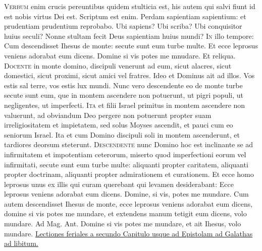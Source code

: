 \begin{multicols*}{2}
\lettrine[lines=2]{\zallmancaps \color{Red} V}{erbum} enim crucis pereuntibus quidem stulticia est, his autem qui salvi fiunt id est nobis virtus Dei est. Scriptum est enim. Perdam sapientiam sapientium: et prudentiam prudentium reprobabo. Ubi sapiens? Ubi scriba? Ubi conquisitor huius seculi? Nonne stultam fecit Deus sapientiam huius mundi?
\lettrine[lines=2]{\zallmancaps \color{Blue} I}{n} illo tempore: Cum descendisset Ihesus de monte: secute sunt eum turbe multe. Et ecce leprosus veniens adorabat eum dicens. Domine si vis potes me mnudare. Et reliqua.
\lettrine[lines=2]{\zallmancaps \color{Red} D}{ocente} in monte domino, discipuli venerunt ad eum, sicut alacres, sicut domestici, sicut proximi, sicut amici vel fratres. Ideo et Dominus ait ad illos. Vos estis sal terre, vos estis lux mundi. Nunc vero descendente eo de monte turbe secute sunt eum, que in montem ascendere non potuerunt, ut pigri populi, ut negligentes, ut imperfecti.
\lettrine[lines=2]{\zallmancaps \color{Red} I}{ta} et filii Israel primitus in montem ascendere non valuerunt, ad obviandum Deo pergere non potuerunt propter suam irreligiositatem et impietatem, sed solus Moyses ascendit, et pauci cum eo seniorum Israel. Ita et cum Domino discipuli soli in montem ascenderunt, et tardiores deorsum steterunt.
\lettrine[lines=2]{\zallmancaps \color{Blue} D}{escendente} nunc Domino hoc est inclinante se ad infirmitatem et impotentiam ceterorum, miserto quod imperfectioni eorum vel infirmitati, secute sunt eum turbe multe: aliquanti propter caritatem, aliquanti propter doctrinam, aliquanti propter admirationem et curationem. Et ecce homo leprosus unus ex illis qui curam querebant qui levamen desiderabant: Ecce leprosus veniens adorabat eum dicens. Domine, si vis, potes me mundare.
 Cum autem descendisset Ihesus de monte, ecce leprosus veniens adorabat eum dicens, domine si vis potes me mundare, et extendens manum tetigit eum dicens, volo mundare. {\color{Red} Ad Mag. Ant.} Domine si vis potes me mundare, et ait Ihesus, volo mundare.
\newline \ul{Lectiones feriales a secundo Capitulo usque ad Epistolam ad Galathas ad libitum.}

\end{multicols*}
